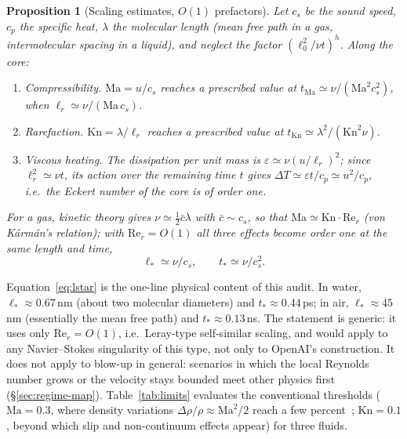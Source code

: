 \documentclass[11pt,a4paper]{article}
\newtheorem{proposition}{Proposition}[section]
\begin{document}
\begin{proposition}[Scaling estimates, $O(1)$ prefactors]\label{prop:scales}
Let $c_s$ be the sound speed, $c_p$ the specific heat, $\lambda$ the molecular length (mean free
path in a gas, intermolecular spacing in a liquid), and neglect the factor $(\ell_0^2/\nu t)^h$.
Along the core:
\begin{enumerate}
  \item \emph{Compressibility.} $\mathrm{Ma}=u/c_s$ reaches a prescribed value at
        $t_{\mathrm{Ma}}\simeq\nu/(\mathrm{Ma}^2c_s^2)$, when $\ell_r\simeq\nu/(\mathrm{Ma}\,c_s)$.
  \item \emph{Rarefaction.} $\mathrm{Kn}=\lambda/\ell_r$ reaches a prescribed value at
        $t_{\mathrm{Kn}}\simeq\lambda^2/(\mathrm{Kn}^2\nu)$.
  \item \emph{Viscous heating.} The dissipation per unit mass is $\varepsilon\simeq\nu(u/\ell_r)^2$;
        since $\ell_r^2\simeq\nu t$, its action over the remaining time $t$ gives
        $\Delta T\simeq\varepsilon t/c_p\simeq u^2/c_p$, i.e.\ the Eckert number of the core is of
        order one.
\end{enumerate}
For a gas, kinetic theory gives $\nu\simeq\tfrac12\bar c\lambda$ with $\bar c\sim c_s$, so that
$\mathrm{Ma}\simeq\mathrm{Kn}\cdot\mathrm{Re}_r$ (von K\'arm\'an's relation); with
$\mathrm{Re}_r=O(1)$ all three effects become order one at the same length and time,
\begin{equation}
  \ell_*\simeq\nu/c_s,\qquad t_*\simeq\nu/c_s^2 .
  \label{eq:lstar}
\end{equation}
\end{proposition}

Equation~\eqref{eq:lstar} is the one-line physical content of this audit. In water,
$\ell_*\approx0.67$\,nm (about two molecular diameters) and $t_*\approx0.44$\,ps; in air,
$\ell_*\approx45$\,nm (essentially the mean free path) and $t_*\approx0.13$\,ns. The statement is
generic: it uses only $\mathrm{Re}_r=O(1)$, i.e.\ Leray-type self-similar scaling, and would apply to
any Navier--Stokes singularity of this type, not only to OpenAI's construction. It does not apply to
blow-up in general: scenarios in which the local Reynolds number grows or the velocity stays bounded
meet other physics first (\S\ref{sec:regime-map}).
Table~\ref{tab:limits} evaluates the conventional thresholds ($\mathrm{Ma}=0.3$, where density
variations $\Delta\rho/\rho\approx\mathrm{Ma}^2/2$ reach a few percent~\cite{LandauLifshitz1987,Batchelor1967};
$\mathrm{Kn}=0.1$, beyond which slip and non-continuum effects appear) for three fluids.
\end{document}

